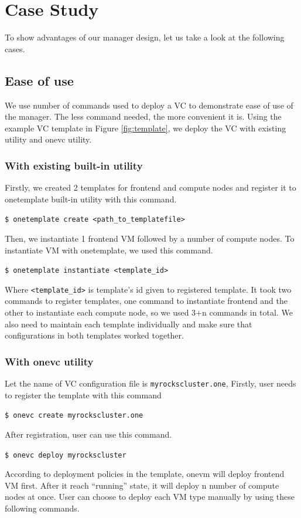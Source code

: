 \documentclass[conference]{IEEEtran}
\begin{document}
\section{Case Study}
To show advantages of our manager design, let us take a look at the following cases.
 
\subsection{Ease of use}
We use number of commands used to deploy a VC to demonstrate ease of use of the manager.
The less command needed, the more convenient it is.
Using the example VC template in Figure \ref{fig:template}, we deploy the VC with existing utility and onevc utility.

\subsubsection{With existing built-in utility}
Firstly, we created 2 templates for frontend and compute nodes and register it to onetemplate built-in utility with this command.

\texttt{\$ onetemplate create <path\_to\_templatefile>}

Then, we instantiate 1 frontend VM followed by a number of compute nodes.
To instantiate VM with onetemplate, we used this command.

\texttt{\$ onetemplate instantiate <template\_id>}

Where \texttt{<template\_id>} is template's id given to registered template.
It took two commands to register templates, one command to instantiate frontend and the other to instantiate each compute node, so we used 3+n commands in total.
We also need to maintain each template individually and make sure that configurations in both templates worked together.

\subsubsection{With onevc utility}

Let the name of VC configuration file is \texttt{myrockscluster.one}, Firstly, user needs to register the template with this command

\texttt{\$ onevc create myrockscluster.one}

After registration, user can use this command.

\texttt{\$ onevc deploy myrockscluster}

According to deployment policies in the template, onevm will deploy frontend VM first.
After it reach ``running'' state, it will deploy n number of compute nodes at once.
User can choose to deploy each VM type manually by using these following commands. 
\end{document}

